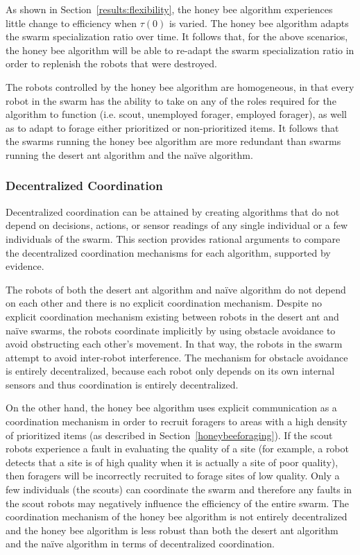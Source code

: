 \documentclass[preprint,12pt]{elsarticle}
\begin{document}
As shown in Section~\ref{results:flexibility}, the honey bee algorithm experiences little change to efficiency when $\tau(0)$ is varied. The honey bee algorithm adapts the swarm specialization ratio  over time. It follows that, for the above scenarios, the honey bee algorithm will be able to re-adapt the swarm specialization ratio in order to replenish the robots that were destroyed. 

The robots controlled by the honey bee algorithm are homogeneous, in that every robot in the swarm has the ability to take on any of the roles required for the algorithm to function (i.e. scout, unemployed forager, employed forager), as well as to adapt to forage either prioritized or non-prioritized items. It follows that the swarms running the honey bee algorithm are more redundant than swarms running the desert ant algorithm and the na\"ive algorithm.

\subsubsection{Decentralized Coordination}
\label{results:decentralizedcoordination}

Decentralized coordination can be attained by creating algorithms that do not depend on decisions, actions, or sensor readings of any single individual or a few individuals of the swarm. This section provides rational arguments to compare the decentralized coordination mechanisms for each algorithm, supported by evidence. 

The robots of both the desert ant algorithm and na\"ive algorithm do not depend on each other and there is no explicit coordination mechanism. Despite no explicit coordination mechanism existing between robots in the desert ant and na\"ive swarms, the robots coordinate implicitly by using obstacle avoidance to avoid obstructing each other's movement. In that way, the robots in the swarm attempt to avoid inter-robot interference. The mechanism for obstacle avoidance is entirely decentralized, because each robot only depends on its own internal sensors and thus coordination is entirely decentralized.

On the other hand, the honey bee algorithm uses explicit communication as a coordination mechanism in order to recruit foragers to areas with a high density of prioritized items (as described in Section~\ref{honeybeeforaging}). If the scout robots experience a fault in evaluating the quality of a site (for example, a robot detects that a site is of high quality when it is actually a site of poor quality), then foragers will be incorrectly recruited to forage sites of low quality. Only a few individuals (the scouts) can coordinate the swarm and therefore any faults in the scout robots may negatively influence the efficiency of the entire swarm. The coordination mechanism of the honey bee algorithm is not entirely decentralized and the honey bee algorithm is less robust than both the desert ant algorithm and the na\"ive algorithm in terms of decentralized coordination.
\end{document}
